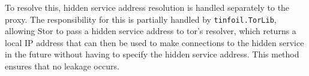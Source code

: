 			To resolve this, hidden service address resolution is handled separately to the proxy. The responsibility for this is partially handled by \texttt{tinfoil.TorLib}, allowing Stor to pass a hidden service address to tor's resolver, which returns a local IP address that can then be used to make connections to the hidden service in the future without having to specify the hidden service address. This method ensures that no leakage occurs.